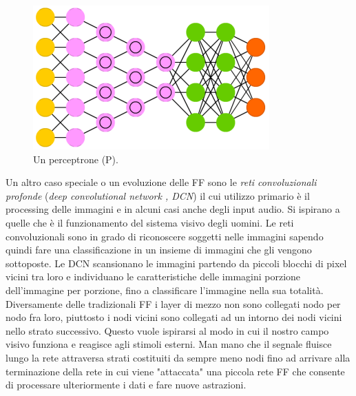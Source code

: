 \begin{figure}
\includegraphics[scale=0.7]{media_tesi/DCN.png}
\caption{Un perceptrone (P).}\label{wrap-fig:1}
\end{figure} 
Un altro caso speciale o un evoluzione delle FF sono le \textit{reti convoluzionali profonde} (\textit{deep convolutional network , DCN}) il cui utilizzo primario è il processing delle immagini e in alcuni casi anche degli input audio. Si ispirano a quelle che è il funzionamento del sistema visivo degli uomini.
Le reti convoluzionali sono in grado di riconoscere soggetti nelle immagini sapendo quindi fare una classificazione in un insieme di immagini che gli vengono sottoposte. Le DCN scansionano le immagini partendo da piccoli blocchi di pixel vicini tra loro e individuano le caratteristiche delle immagini porzione dell'immagine per porzione, fino a classificare l'immagine nella sua totalità.
Diversamente delle tradizionali FF i layer di mezzo non sono collegati nodo per nodo fra loro, piuttosto i nodi vicini sono collegati ad un intorno dei nodi vicini nello strato successivo. Questo vuole ispirarsi al modo in cui il nostro campo visivo funziona e reagisce agli stimoli esterni. Man mano che il segnale fluisce lungo la rete attraversa strati costituiti da sempre meno nodi fino ad arrivare alla terminazione della rete in cui viene "attaccata" una piccola rete FF che consente di processare ulteriormente i dati e fare nuove astrazioni.

